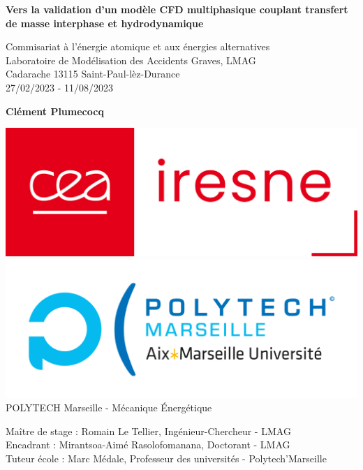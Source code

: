 \documentclass[a4paper,11pt]{report}    %
\begin{document}

\hypersetup{pageanchor=false}
\begin{titlepage}
    \begin{center}
        \vspace*{1cm}

        \Huge
        \textbf{Vers la validation d’un modèle CFD multiphasique couplant transfert de masse interphase et hydrodynamique}

        \vspace{0.5cm}
        \LARGE
        Commisariat à l'énergie atomique et aux énergies alternatives \\
        Laboratoire de Modélisation des Accidents Graves, LMAG\\
        \Large Cadarache 13115 Saint-Paul-lèz-Durance\\
         27/02/2023 - 11/08/2023
        \vspace{1.5cm}

        \textbf{\LARGE Clément Plumecocq}

        \vfill

        \includegraphics[scale=0.15]{logo_iresne.png}\includegraphics[scale=0.20]{polytech.jpg}
        \vfill
        \Large
        \noindent%
        POLYTECH Marseille - Mécanique Énergétique \\ \vfill
	\raggedright 
	\noindent Maître de stage : Romain Le Tellier, Ingénieur-Chercheur - LMAG\\
	Encadrant : Mirantsoa-Aimé Rasolofomanana, Doctorant - LMAG \\
	Tuteur école : Marc Médale, Professeur des universités - Polytech'Marseille 


\end{center}
\end{titlepage}
\end{document}
